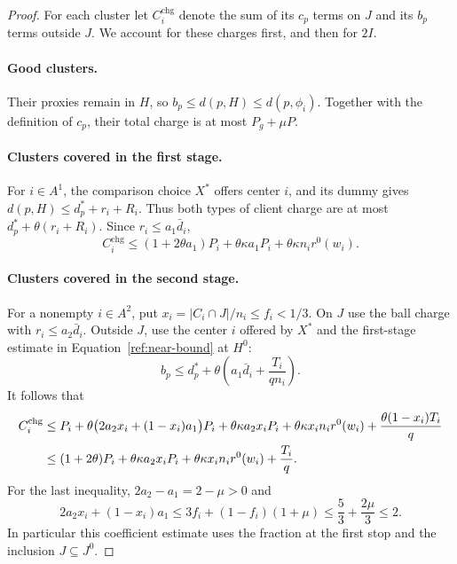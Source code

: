 \begin{proof}
For each cluster let $C_i^{\mathrm{chg}}$ denote the sum of its $c_p$ terms
on $J$ and its $b_p$ terms outside $J$.  We account for these charges first,
and then for $2I$.

\paragraph{Good clusters.}
Their proxies remain in $H$, so $b_p\le d(p,H)\le d(p,\phi_i)$.
Together with the definition of $c_p$, their total charge is at most
$P_g+\mu P$.

\paragraph{Clusters covered in the first stage.}
For $i\in A^1$, the comparison choice $X^*$ offers center $i$, and its dummy gives
$d(p,H)\le d_p^*+r_i+R_i$.  Thus both types of client charge are at most
$d_p^*+\theta(r_i+R_i)$.  Since $r_i\le a_1\bar d_i$,
\begin{equation}\label{ref:first-covered}
 C_i^{\mathrm{chg}}
 \le (1+2\theta a_1)P_i
       +\theta\kappa a_1P_i
       +\theta\kappa n_i r^0(w_i).
\end{equation}

\paragraph{Clusters covered in the second stage.}
For a nonempty $i\in A^2$, put
$x_i=|C_i\cap J|/n_i\le f_i<1/3$.  On $J$ use the ball charge with
$r_i\le a_2\bar d_i$.  Outside $J$, use the center $i$ offered by $X^*$ and the
first-stage estimate in Equation~\eqref{ref:near-bound} at $H^0$:
\[
 b_p\le d_p^*+\theta\left(a_1\bar d_i+\frac{T_i}{qn_i}\right).
\]
It follows that
\begin{align}
 C_i^{\mathrm{chg}}
 &\le P_i+\theta\bigl(2a_2x_i+(1-x_i)a_1\bigr)P_i
       +\theta\kappa a_2x_iP_i
       +\theta\kappa x_in_i r^0(w_i)
       +\frac{\theta(1-x_i)T_i}{q}\notag\\
 &\le (1+2\theta)P_i
       +\theta\kappa a_2x_iP_i
       +\theta\kappa x_in_i r^0(w_i)
       +\frac{T_i}{q}.
 \label{ref:second-covered}
\end{align}
For the last inequality, $2a_2-a_1=2-\mu>0$ and
\begin{equation}\label{ref:second-coefficient}
 2a_2x_i+(1-x_i)a_1
 \le 3f_i+(1-f_i)(1+\mu)
 \le \frac53+\frac{2\mu}{3}\le2.
\end{equation}
In particular this coefficient estimate uses the fraction at the first
stop and the inclusion $J\subseteq J^0$.


\end{proof}
